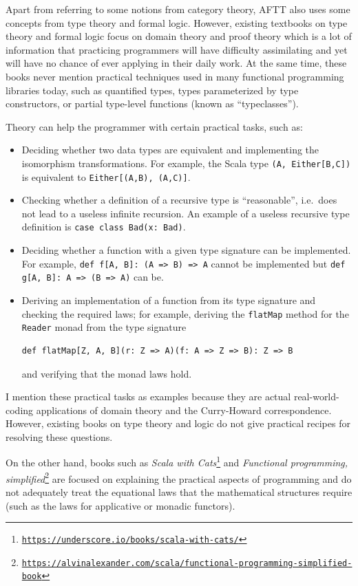 Apart from referring to some notions from category theory, AFTT also
uses some concepts from type theory and formal logic. However, existing
textbooks on type theory and formal logic focus on domain theory and
proof theory \textendash{} which is a lot of information that practicing
programmers will have difficulty assimilating and yet will have no
chance of ever applying in their daily work. At the same time, these
books never mention practical techniques used in many functional programming
libraries today, such as quantified types, types parameterized by
type constructors, or partial type-level functions (known as ``typeclasses'').

Theory can help the programmer with certain practical tasks, such
as:
\begin{itemize}
\item Deciding whether two data types are equivalent and implementing the
isomorphism transformations. For example, the Scala type \lstinline!(A, Either[B,C])!
is equivalent to \lstinline!Either[(A,B), (A,C)]!.
\item Checking whether a definition of a recursive type is ``reasonable'',
i.e.~does not lead to a useless infinite recursion. An example of
a useless recursive type definition is \lstinline!case class Bad(x: Bad)!.
\item Deciding whether a function with a given type signature can be implemented.
For example, \lstinline!def f[A, B]: (A => B) => A! cannot be implemented
but \lstinline!def g[A, B]: A => (B => A)! can be. 
\item Deriving an implementation of a function from its type signature and
checking the required laws; for example, deriving the \lstinline!flatMap!
method for the \lstinline!Reader! monad from the type signature 
\begin{lstlisting}
def flatMap[Z, A, B](r: Z => A)(f: A => Z => B): Z => B
\end{lstlisting}
and verifying that the monad laws hold.
\end{itemize}
I mention these practical tasks as examples because they are actual
real-world-coding applications of domain theory and the Curry-Howard
correspondence. However, existing books on type theory and logic do
not give practical recipes for resolving these questions.

On the other hand, books such as \emph{Scala with Cats}\footnote{\texttt{\href{https://underscore.io/books/scala-with-cats/}{https://underscore.io/books/scala-with-cats/}}}
and \emph{Functional programming, simplified}\footnote{\texttt{\href{https://alvinalexander.com/scala/functional-programming-simplified-book}{https://alvinalexander.com/scala/functional-programming-simplified-book}}}
are focused on explaining the practical aspects of programming and
do not adequately treat the equational laws that the mathematical
structures require (such as the laws for applicative or monadic functors).

